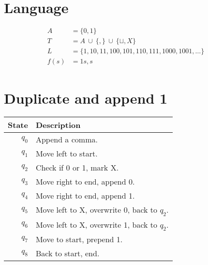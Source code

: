 \documentclass[a4paper, hidelinks, twocolumn, 9pt]{article}
\title{\topicname}
\author{}
\date{}
\newcommand{\blm}{\sqcup}
\begin{document}
  
\maketitle
\thispagestyle{fancy}

\section*{Language}
  \begin{align*}
    A &= \{ 0, 1 \} \\
    T &= A \ \cup \ \{ , \} \ \cup \  \{ \blm,  X \} \\
    L &= \{1, 10, 11, 100, 101, 110, 111, 1000, 1001, \ldots \} \\
    f(s) &= 1s,s \\
  \end{align*}

\section*{Duplicate and append 1}
  \begin{tabular}{rl}
    \textbf{State} & \textbf{Description} \\
    \midrule
    \( q_0 \) & Append a comma. \\
    \( q_1 \) & Move left to start. \\
    \( q_2 \) & Check if 0 or 1, mark X. \\
    \( q_3 \) & Move right to end, append 0. \\
    \( q_4 \) & Move right to end, append 1. \\
    \( q_5 \) & Move left to X, overwrite 0, back to \(q_2\). \\
    \( q_6 \) & Move left to X, overwrite 1, back to \(q_2\). \\
    \( q_7 \) & Move to start, prepend 1. \\
    \( q_8 \) & Back to start, end. \\
  \end{tabular}
\end{document}
